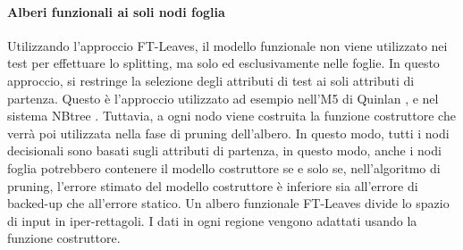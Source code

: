 \paragraph{Alberi funzionali ai soli nodi foglia}
\label{Alberi funzionali ai soli nodi foglia}
Utilizzando l'approccio FT-Leaves, il modello funzionale non viene utilizzato nei test per effettuare lo splitting, ma solo ed esclusivamente nelle foglie. In questo approccio, si restringe la selezione degli attributi di test ai soli attributi di partenza.
Questo è l'approccio utilizzato ad esempio nell'M5 di Quinlan \cite{DBLP:conf/icml/Quinlan93}, e nel sistema NBtree \cite{Kohavi1996}. 
Tuttavia, a ogni nodo viene costruita la funzione costruttore che verrà poi utilizzata nella fase di pruning dell'albero. In questo modo, tutti i nodi decisionali sono basati sugli attributi di partenza, in questo modo, anche i nodi foglia potrebbero contenere il modello costruttore se e solo se, nell'algoritmo di pruning, l'errore stimato del modello costruttore è inferiore sia all'errore di backed-up che all'errore statico. Un albero funzionale FT-Leaves divide lo spazio di input in iper-rettagoli. I dati in ogni regione vengono adattati usando la funzione costruttore.

